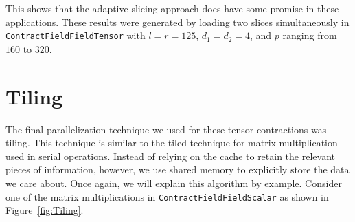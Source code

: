 This shows that the adaptive slicing approach does have some promise in these applications. These results were generated by loading two slices simultaneously in \texttt{ContractFieldFieldTensor} with $l = r = 125$, $d_1 = d_2 = 4$, and $p$ ranging from $160$ to $320$.

\section{Tiling}\label{sec:tiling}

The final parallelization technique we used for these tensor contractions was
tiling. This technique is similar to the tiled technique for matrix
multiplication used in serial operations. Instead of relying on the cache to
retain the relevant pieces of information, however, we use shared memory to
explicitly store the data we care about. Once again, we will explain this
algorithm by example. Consider one of the matrix multiplications in
\texttt{ContractFieldFieldScalar} as shown in Figure~\ref{fig:Tiling}. 


